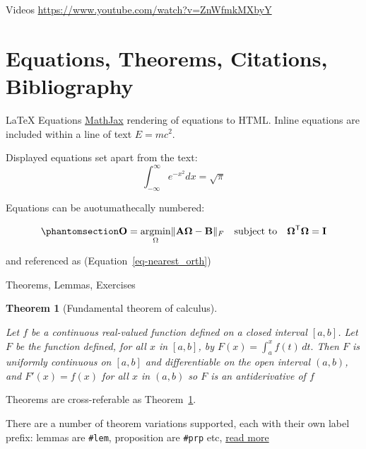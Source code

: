 \documentclass[
  ignorenonframetext,
  aspectratio=169,
]{beamer}
\theoremstyle{plain}
\newtheorem{theorem}{Theorem}[section]
\theoremstyle{remark}
\begin{document}
\begin{frame}{Videos}
\label{videos}
\url{https://www.youtube.com/watch?v=ZnWfmkMXbyY}
\end{frame}

\section{Equations, Theorems, Citations,
Bibliography}\label{equations-theorems-citations-bibliography}

\begin{frame}{LaTeX Equations}
\label{latex-equations}
\href{https://www.mathjax.org/}{MathJax} rendering of equations to HTML.
Inline equations are included within a line of text \(E=mc^2\).

Displayed equations set apart from the text: \[
\int_{-\infty}^\infty e^{-x^2}dx = \sqrt{\pi}
\]

Equations can be auotumathecally numbered:

\begin{equation}\phantomsection\label{eq-nearest_orth}{
\mathbf {O} ={\underset {\Omega }{\operatorname {argmin} }}\|\mathbf {A} {\boldsymbol {\Omega }}-\mathbf {B} \|_{F}\quad {\text{subject to}}\quad {\boldsymbol {\Omega }}^{\textsf {T}}{\boldsymbol {\Omega }}=\mathbf {I}
}\end{equation}

and referenced as (Equation~\ref{eq-nearest_orth})
\end{frame}

\begin{frame}[fragile]{Theorems, Lemmas, Exercises}
\label{theorems-lemmas-exercises}
\begin{theorem}[Fundamental theorem of
calculus]\protect\hypertarget{thm-calculus}{}\label{thm-calculus}

Let \(f\) be a continuous real-valued function defined on a closed
interval \([a, b]\). Let \(F\) be the function defined, for all \(x\) in
\([a, b]\), by \(F(x)=\int _{a}^{x}f(t)\,dt.\) Then \(F\) is uniformly
continuous on \([a, b]\) and differentiable on the open interval
\((a, b)\), and \(F'(x)=f(x)\) for all \(x\) in \((a, b)\) so \(F\) is
an antiderivative of \(f\)

\end{theorem}

Theorems are cross-referable as Theorem~\ref{thm-calculus}.

There are a number of theorem variations supported, each with their own
label prefix: lemmas are \texttt{\#lem}, proposition are \texttt{\#prp}
etc,
\href{https://quarto.org/docs/authoring/cross-references.html\#theorems-and-proofs}{read
more}
\end{frame}
\end{document}
